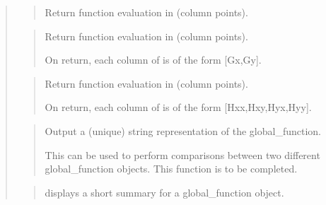 \documentclass[a4paper,11pt,english]{sphinxmanual}
\begin{document}
\sphinxAtStartPar
{}
\begin{quote}

\sphinxAtStartPar
{}
\begin{quote}

\sphinxAtStartPar
Return  function evaluation in  (column points).
\end{quote}

\sphinxAtStartPar
{}
\begin{quote}

\sphinxAtStartPar
Return  function evaluation in  (column points).

\sphinxAtStartPar
On return, each column of  is of the
form {[}Gx,Gy{]}.
\end{quote}

\sphinxAtStartPar
{}
\begin{quote}

\sphinxAtStartPar
Return  function evaluation in  (column points).

\sphinxAtStartPar
On return, each column of  is of the
form {[}Hxx,Hxy,Hyx,Hyy{]}.
\end{quote}

\sphinxAtStartPar
{}
\begin{quote}

\sphinxAtStartPar
Output a (unique) string representation of the global\_function.

\sphinxAtStartPar
This can be used to perform comparisons between two
different global\_function objects.
This function is to be completed.
\end{quote}

\sphinxAtStartPar
{}
\begin{quote}

\sphinxAtStartPar
displays a short summary for a global\_function object.
\end{quote}
\end{quote}
\end{document}
